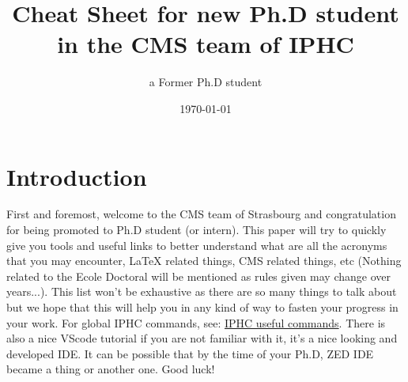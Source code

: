 \documentclass[reprint, a4paper, nofootinbib, amsmath, amssymb, aps]{revtex4-1}
\begin{document}
\title{Cheat Sheet for new Ph.D student in the CMS team of IPHC}

\author{a Former Ph.D student}

\date{\today}

\maketitle

\section{Introduction}

First and foremost, welcome to the CMS team of Strasbourg and congratulation for being promoted to Ph.D student (or intern). This paper will try to quickly give you tools and useful links to better understand what are all the acronyms that you may encounter, LaTeX related things, CMS related things, etc (Nothing related to the Ecole Doctoral will be mentioned as rules given may change over years...). This list won't be exhaustive as there are so many things to talk about but we hope that this will help you in any kind of way to fasten your progress in your work. For global IPHC commands, see: \href{https://twiki.cern.ch/twiki/bin/viewauth/CMS/IPHCusefulCommands#VScode}{IPHC useful commands}. There is also a nice VScode tutorial if you are not familiar with it, it's a nice looking and developed IDE. It can be possible that by the time of your Ph.D, ZED IDE became a thing or another one. Good luck!  
\end{document}
